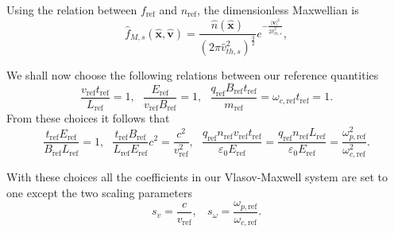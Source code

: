 \documentclass[english]{article}
\newcommand{\bx}{\textbf{x}}
\newcommand{\bv}{\textbf{v}}
\newcommand{\tr}{t_{\mathrm{ref}}}
\newcommand{\xr}{L_{\mathrm{ref}}}
\newcommand{\nr}{n_{\mathrm{ref}}}
\newcommand{\fr}{f_{\mathrm{ref}}}
\newcommand{\qr}{q_{\mathrm{ref}}}
\newcommand{\mr}{m_{\mathrm{ref}}}
\newcommand{\Br}{B_{\mathrm{ref}}}
\newcommand{\Er}{E_{\mathrm{ref}}}
\newcommand{\vr}{v_{\mathrm{ref}}}
\newcommand{\ompr}{\omega_{p,\mathrm{ref}}}
\newcommand{\omcr}{\omega_{c,\mathrm{ref}}}
\newcommand{\xht}{\hat{\bx}}
\newcommand{\vht}{\hat{\bv}}
\newcommand{\nht}{\hat{n}}
\newcommand{\fht}{\hat{f}}
\begin{document}
Using the relation between $\fr$ and $\nr$, the dimensionless Maxwellian is
\begin{equation}\label{eq:maxwellianD}
	\fht_{M,s}(\xht,\vht)= \frac{\nht(\xht)}{(2\pi \hat{v}_{th,s}^2)^{\frac 32}} e^{-\frac{|\bv|^2}{2\hat{v}_{th,s}^2}},
\end{equation}

We shall now choose the following relations between our reference quantities
\begin{equation}
	\frac{\vr\tr}{\xr}=1, ~~~ \frac{\Er}{\vr\Br}=1, ~~~ \frac{\qr\Br\tr}{\mr} = \omcr\tr =1.
\end{equation}
From these choices it follows that
\begin{equation}
	\frac{\tr \Er}{\Br\xr} = 1, ~~~ \frac{\tr\Br}{\xr\Er} c^2 = \frac{c^2}{\vr^2}, ~~~
	\frac{\qr\nr\vr\tr}{\varepsilon_0\Er}= \frac{\qr\nr\xr}{\varepsilon_0\Er}= \frac{\ompr^2}{\omcr^2}.
\end{equation}

With these choices all the coefficients in our Vlasov-Maxwell system are set to one except the two scaling parameters
\begin{equation}
	s_v = \frac{c}{\vr}, ~~~~ s_\omega = \frac{\ompr}{\omcr}.
\end{equation}
\end{document}
